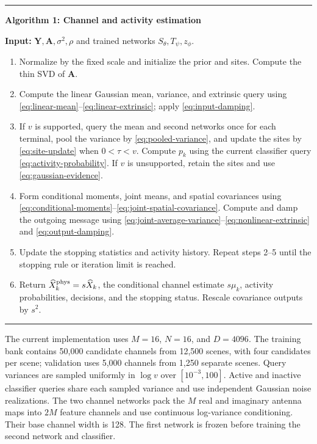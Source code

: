 \documentclass[10pt,a4paper]{article}
\begin{document}
\begin{center}
\begin{minipage}{0.95\linewidth}
\hrule\vspace{5pt}
\textbf{Algorithm 1: Channel and activity estimation}\par
\textbf{Input:} $\mathbf{Y},\mathbf{A},\sigma^2,\rho$ and trained networks
$S_\theta,T_\psi,z_\phi$.\par
\begin{enumerate}[leftmargin=1.8em,itemsep=2pt,topsep=4pt]
 \item Normalize by the fixed scale and initialize the prior and sites.
 Compute the thin SVD of $\mathbf{A}$.
 \item Compute the linear Gaussian mean, variance, and extrinsic query
 using \eqref{eq:linear-mean}--\eqref{eq:linear-extrinsic}; apply
 \eqref{eq:input-damping}.
 \item If $v$ is supported, query the mean and second networks once for
 each terminal, pool the variance by \eqref{eq:pooled-variance}, and
 update the sites by \eqref{eq:site-update} when $0<\tau<v$.
 Compute $p_k$ using the current classifier query
 \eqref{eq:activity-probability}. If $v$ is unsupported, retain the
 sites and use \eqref{eq:gaussian-evidence}.
 \item Form conditional moments, joint means, and spatial covariances
 using \eqref{eq:conditional-moments}--\eqref{eq:joint-spatial-covariance}.
 Compute and damp the outgoing message using
 \eqref{eq:joint-average-variance}--\eqref{eq:nonlinear-extrinsic} and
 \eqref{eq:output-damping}.
 \item Update the stopping statistics and activity history. Repeat
 steps 2--5 until the stopping rule or iteration limit is reached.
 \item Return $\widehat X_k^{\rm phys}=s\widehat X_k$, the conditional
 channel estimate $s\mu_k$, activity probabilities, decisions, and the
 stopping status. Rescale covariance outputs by $s^2$.
\end{enumerate}
\vspace{3pt}\hrule
\end{minipage}
\end{center}

The current implementation uses $M=16$, $N=16$, and $D=4096$.
The training bank contains 50,000 candidate channels from 12,500 scenes,
with four candidates per scene; validation uses 5,000 channels from
1,250 separate scenes. Query variances are sampled uniformly in $\log v$
over $[10^{-3},100]$. Active and inactive classifier queries share each
sampled variance and use independent Gaussian noise realizations.
The two channel networks pack the $M$ real and imaginary antenna maps
into $2M$ feature channels and use continuous log-variance conditioning.
Their base channel width is 128. The first network is frozen before
training the second network and classifier.
\end{document}

